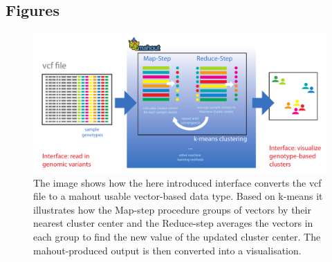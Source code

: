 \documentclass[twocolumn]{bmcart}%
\begin{document}
\begin{backmatter}


\section*{Figures}
  \begin{figure}[h!]
  \includegraphics[type=pdf,ext=.pdf,read=.pdf, scale=0.40]{images/signature}
  \caption{
      The image shows how the here introduced interface converts the vcf file to a mahout usable vector-based data type. Based on k-means it illustrates how the Map-step procedure groups of vectors by their nearest cluster center and the Reduce-step averages the vectors in each group to find the new value of the updated cluster center. The mahout-produced output is then converted into a visualisation.}
      \end{figure}




\end{backmatter}
\end{document}
